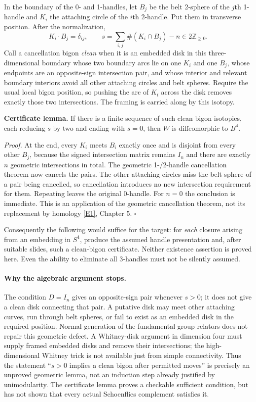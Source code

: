 \documentclass[11pt,a4paper]{article}
\newcommand{\Z}{\mathbb{Z}}
\newcommand{\eref}[2]{\hyperlink{extra:#1:#2}{[E#2]}}
\numberwithin{equation}{section}
\begin{document}
In the boundary of the 0- and 1-handles, let $B_j$ be the belt 2-sphere
of the $j$th 1-handle and $K_i$ the attaching circle of the $i$th
2-handle. Put them in transverse position. After the normalization,
\begin{equation}
 K_i\mathbin{\cdot} B_j=\delta_{ij},\qquad
 s=\sum_{i,j}\#(K_i\cap B_j)-n\in 2\Z_{\geq0}.
\end{equation}
Call a cancellation bigon \emph{clean} when it is an embedded disk in
this three-dimensional boundary whose two boundary arcs lie on one
$K_i$ and one $B_j$, whose endpoints are an opposite-sign intersection
pair, and whose interior and relevant boundary interiors avoid all
other attaching circles and belt spheres. Require the usual local
bigon position, so pushing the arc of $K_i$ across the disk removes
exactly those two intersections. The framing is carried along by this
isotopy.

\textbf{Certificate lemma.} If there is a finite sequence of such clean
bigon isotopies, each reducing $s$ by two and ending with $s=0$, then
$W$ is diffeomorphic to $B^4$.

\emph{Proof.} At the end, every $K_i$ meets $B_i$ exactly once and is
disjoint from every other $B_j$, because the signed intersection matrix
remains $I_n$ and there are exactly $n$ geometric intersections in total.
The geometric 1-/2-handle cancellation theorem now cancels the pairs.
The other attaching circles miss the belt sphere of a pair being
cancelled, so cancellation introduces no new intersection requirement
for them. Repeating leaves the original 0-handle. For $n=0$ the
conclusion is immediate. This is an application of the geometric
cancellation theorem, not its replacement by homology
\eref{3410}{1}, Chapter 5. \hfill$\square$

Consequently the following would suffice for the target: for \emph{each}
closure arising from an embedding in $S^4$, produce the assumed
handle presentation and, after suitable slides, such a clean-bigon
certificate. Neither existence assertion is proved here. Even the
ability to eliminate all 3-handles must not be silently assumed.

\paragraph{Why the algebraic argument stops.}
The condition $D=I_n$ gives an opposite-sign pair whenever $s>0$; it
does not give a clean disk connecting that pair. A putative disk may
meet other attaching curves, run through belt spheres, or fail to exist
as an embedded disk in the required position. Normal generation of the
fundamental-group relators does not repair this geometric defect. A
Whitney-disk argument in dimension four must supply framed embedded
disks and remove their intersections; the high-dimensional Whitney
trick is not available just from simple connectivity. Thus the statement
``$s>0$ implies a clean bigon after permitted moves'' is precisely an
unproved geometric lemma, not an induction step already justified by
unimodularity. The certificate lemma proves a checkable sufficient
condition, but has not shown that every actual Schoenflies complement
satisfies it.
\end{document}
